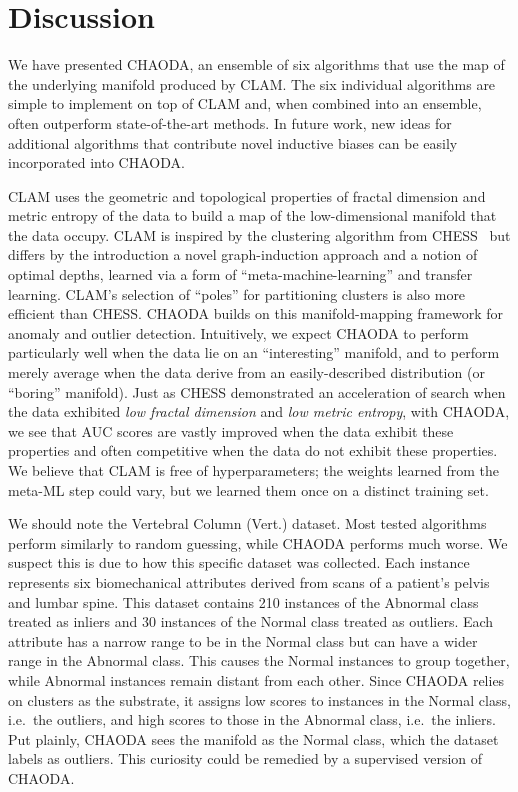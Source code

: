 \section{Discussion}
\label{sec:discussion}

We have presented CHAODA, an ensemble of six algorithms that use the map of the underlying manifold produced by CLAM\@.
The six individual algorithms are simple to implement on top of CLAM and, when combined into an ensemble, often outperform state-of-the-art methods.
In future work, new ideas for additional algorithms that contribute novel inductive biases can be easily incorporated into CHAODA.

CLAM uses the geometric and topological properties of fractal dimension and metric entropy of the data to build a map of the low-dimensional manifold that the data occupy.
CLAM is inspired by the clustering algorithm from CHESS~\cite{ishaq2019clustered} but differs by the introduction a novel graph-induction approach and a notion of optimal depths, learned via a form of ``meta-machine-learning'' and transfer learning.
CLAM's selection of ``poles'' for partitioning clusters is also more efficient than CHESS.
CHAODA builds on this manifold-mapping framework for anomaly and outlier detection.
Intuitively, we expect CHAODA to perform particularly well when the data lie on an ``interesting'' manifold, and to perform merely average when the data derive from an easily-described distribution (or ``boring'' manifold).
Just as CHESS demonstrated an acceleration of search when the data exhibited \emph{low fractal dimension} and \emph{low metric entropy}, with CHAODA, we see that AUC scores are vastly improved when the data exhibit these properties and often competitive when the data do not exhibit these properties.
We believe that CLAM is free of hyperparameters; the weights learned from the meta-ML step could vary, but we learned them once on a distinct training set.

We should note the Vertebral Column (Vert.) dataset.
Most tested algorithms perform similarly to random guessing, while CHAODA performs much worse.
We suspect this is due to how this specific dataset was collected.
Each instance represents six biomechanical attributes derived from scans of a patient's pelvis and lumbar spine.
This dataset contains 210 instances of the Abnormal class treated as inliers and 30 instances of the Normal class treated as outliers.
Each attribute has a narrow range to be in the Normal class but can have a wider range in the Abnormal class.
This causes the Normal instances to group together, while Abnormal instances remain distant from each other.
Since CHAODA relies on clusters as the substrate, it assigns low scores to instances in the Normal class, i.e.\ the outliers, and high scores to those in the Abnormal class, i.e.\ the inliers.
Put plainly, CHAODA sees the manifold as the Normal class, which the dataset labels as outliers.
This curiosity could be remedied by a supervised version of CHAODA.


